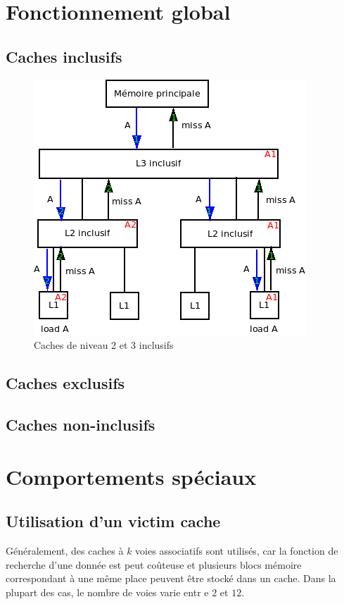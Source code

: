 \documentclass[a4paper]{article}
\begin{document}
\newpage
\section{Fonctionnement global}

\subsection{Caches inclusifs}

\begin{figure}[!h]
\begin{center}
   \includegraphics[scale=0.7]{inclusifs.png}
   \caption{\label{inclusifs} Caches de niveau 2 et 3 inclusifs}
\end{center}
\end{figure}

\subsection{Caches exclusifs}

\subsection{Caches non-inclusifs}


\newpage
\section{Comportements spéciaux}

\subsection{Utilisation d'un victim cache}
\indent Généralement, des caches à $k$ voies associatifs sont utilisés, car la fonction de recherche d'une donnée est peut coûteuse et plusieurs blocs mémoire correspondant à une même place peuvent être stocké dans un cache. Dans la plupart des cas, le nombre de voies varie entr e $2$ et $12$. \\
\end{document}
